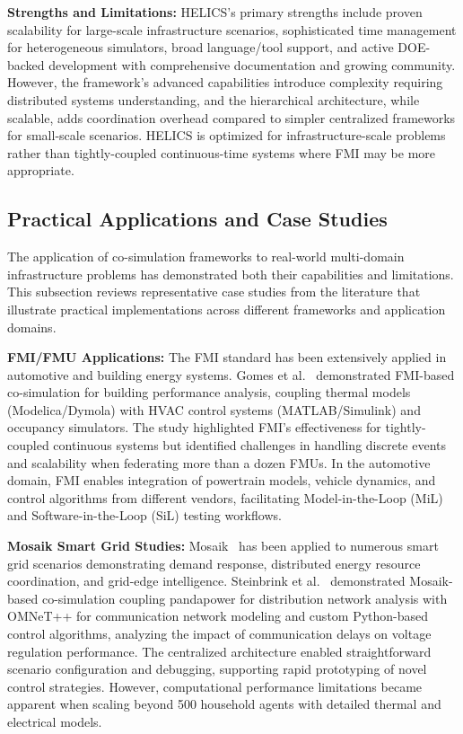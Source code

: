 \textbf{Strengths and Limitations:} HELICS's primary strengths include proven scalability for large-scale infrastructure scenarios, sophisticated time management for heterogeneous simulators, broad language/tool support, and active DOE-backed development with comprehensive documentation and growing community. However, the framework's advanced capabilities introduce complexity requiring distributed systems understanding, and the hierarchical architecture, while scalable, adds coordination overhead compared to simpler centralized frameworks for small-scale scenarios. HELICS is optimized for infrastructure-scale problems rather than tightly-coupled continuous-time systems where FMI may be more appropriate.


\subsection{Practical Applications and Case Studies}

The application of co-simulation frameworks to real-world multi-domain infrastructure problems has demonstrated both their capabilities and limitations. This subsection reviews representative case studies from the literature that illustrate practical implementations across different frameworks and application domains.

\textbf{FMI/FMU Applications:} The FMI standard has been extensively applied in automotive and building energy systems. Gomes et al.~\cite{fmi_application} demonstrated FMI-based co-simulation for building performance analysis, coupling thermal models (Modelica/Dymola) with HVAC control systems (MATLAB/Simulink) and occupancy simulators. The study highlighted FMI's effectiveness for tightly-coupled continuous systems but identified challenges in handling discrete events and scalability when federating more than a dozen FMUs. In the automotive domain, FMI enables integration of powertrain models, vehicle dynamics, and control algorithms from different vendors, facilitating Model-in-the-Loop (MiL) and Software-in-the-Loop (SiL) testing workflows.

\textbf{Mosaik Smart Grid Studies:} Mosaik~\cite{mosaik_cosim} has been applied to numerous smart grid scenarios demonstrating demand response, distributed energy resource coordination, and grid-edge intelligence. Steinbrink et al.~\cite{mosaik_smartgrid} demonstrated Mosaik-based co-simulation coupling pandapower for distribution network analysis with OMNeT++ for communication network modeling and custom Python-based control algorithms, analyzing the impact of communication delays on voltage regulation performance. The centralized architecture enabled straightforward scenario configuration and debugging, supporting rapid prototyping of novel control strategies. However, computational performance limitations became apparent when scaling beyond 500 household agents with detailed thermal and electrical models.

